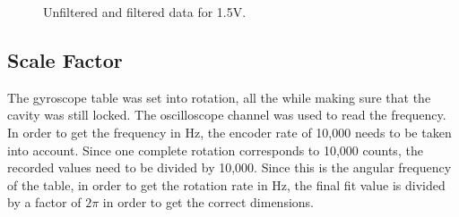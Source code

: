 \documentclass[a4paper]{report}
\numberwithin{equation}{section}
\begin{document}



\begin{figure}[h!]
	\centering
	\quad
	\centering
	\caption{Unfiltered and filtered data for 1.5V.}
\end{figure}

\subsection{Scale Factor} \label{sec:scale_fact}
The gyroscope table was set into rotation, all the while making sure that the cavity was still locked. The oscilloscope channel was used to read the frequency. In order to get the frequency in Hz, the encoder rate of 10,000 needs to be taken into account. Since one complete rotation corresponds to 10,000 counts, the recorded values need to be divided by 10,000. Since this is the angular frequency of the table, in order to get the rotation rate in $\si{\hertz}$, the final fit value is divided by a factor of $2 \pi$ in order to get the correct dimensions. 
\end{document}
